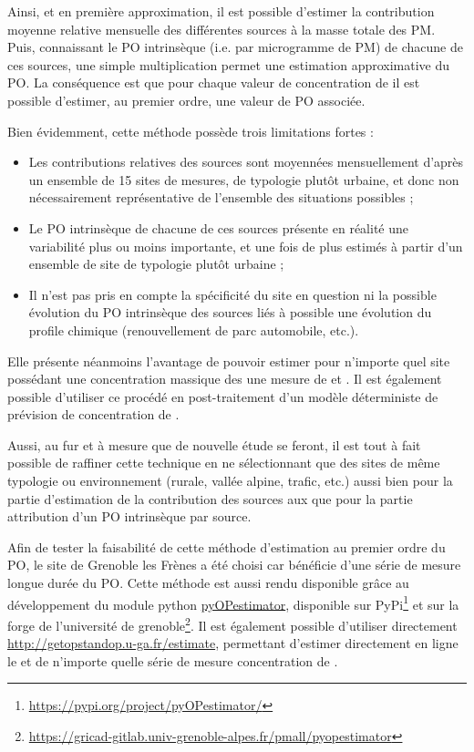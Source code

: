 Ainsi, et en première approximation, il est possible d'estimer la contribution moyenne relative mensuelle des différentes sources à la masse totale des PM. Puis, connaissant le PO intrinsèque (i.e. par microgramme de PM) de chacune de ces sources, une simple multiplication permet une estimation approximative du PO.
La conséquence est que pour chaque valeur de concentration de \PMdix{} il est possible d'estimer, au premier ordre, une valeur de PO associée.

Bien évidemment, cette méthode possède trois limitations fortes : 
\begin{itemize}
    \item Les contributions relatives des sources sont moyennées mensuellement d'après un ensemble de 15 sites de mesures, de typologie plutôt urbaine, et donc non nécessairement représentative de l'ensemble des situations possibles ;
    \item Le PO intrinsèque de chacune de ces sources présente en réalité une variabilité plus ou moins importante, et une fois de plus estimés à partir d'un ensemble de site de typologie plutôt urbaine ;
    \item Il n'est pas pris en compte la spécificité du site en question ni la possible évolution du PO intrinsèque des sources liés à possible une évolution du profile chimique (renouvellement de parc automobile, etc.).
\end{itemize}

Elle présente néanmoins l'avantage de pouvoir estimer pour n'importe quel site 
possédant une concentration massique des \PMdix{} une mesure de \POAAv{} et 
\PODTTv. Il est également possible d'utiliser ce procédé en post-traitement d'un 
modèle déterministe de prévision de concentration de \PMdix.

Aussi, au fur et à mesure que de nouvelle étude se feront, il est tout à fait possible de raffiner cette technique en ne sélectionnant que des sites de même typologie ou environnement (rurale, vallée alpine, trafic, etc.) aussi bien pour la partie d'estimation de la contribution des sources aux \PMdix{} que pour la partie attribution d'un PO intrinsèque par source.

Afin de tester la faisabilité de cette méthode d'estimation au premier ordre du 
PO, le site de Grenoble les Frènes a été choisi car bénéficie d'une série de 
mesure longue durée du PO. Cette méthode est aussi rendu disponible grâce au 
développement du module python 
\href{https://gricad-gitlab.univ-grenoble-alpes.fr/pmall/pyopestimator}{pyOPestimator},
disponible sur PyPi\footnote{\url{https://pypi.org/project/pyOPestimator/}}
et sur la forge de l'université de grenoble\footnote{\url{https://gricad-gitlab.univ-grenoble-alpes.fr/pmall/pyopestimator}}. Il est également possible d'utiliser directement \url{http://getopstandop.u-ga.fr/estimate}, permettant d'estimer directement en ligne le \POAAv{} et \PODTTv{} de n'importe quelle série de mesure concentration de \PMdix.

